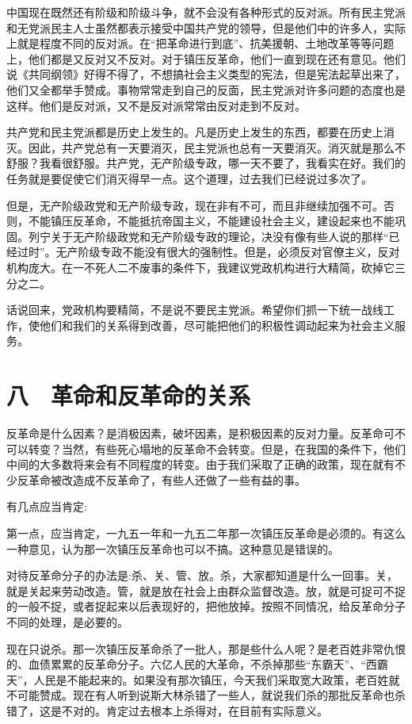 中国现在既然还有阶级和阶级斗争，就不会没有各种形式的反对派。所有民主党派和无党派民主人士虽然都表示接受中国共产党的领导，但是他们中的许多人，实际上就是程度不同的反对派。在“把革命进行到底”、抗美援朝、土地改革等等问题上，他们都是又反对又不反对。对于镇压反革命，他们一直到现在还有意见。他们说《共同纲领》好得不得了，不想搞社会主义类型的宪法，但是宪法起草出来了，他们又全都举手赞成。事物常常走到自己的反面，民主党派对许多问题的态度也是这样。他们是反对派，又不是反对派常常由反对走到不反对。

共产党和民主党派都是历史上发生的。凡是历史上发生的东西，都要在历史上消灭。因此，共产党总有一天要消灭，民主党派也总有一天要消灭。消灭就是那么不舒服？我看很舒服。共产党，无产阶级专政，哪一天不要了，我看实在好。我们的任务就是要促使它们消灭得早一点。这个道理，过去我们已经说过多次了。

但是，无产阶级政党和无产阶级专政，现在非有不可，而且非继续加强不可。否则，不能镇压反革命，不能抵抗帝国主义，不能建设社会主义，建设起来也不能巩固。列宁关于无产阶级政党和无产阶级专政的理论，决没有像有些人说的那样“已经过时”。无产阶级专政不能没有很大的强制性。但是，必须反对官僚主义，反对机构庞大。在一不死人二不废事的条件下，我建议党政机构进行大精简，砍掉它三分之二。

话说回来，党政机构要精简，不是说不要民主党派。希望你们抓一下统一战线工作，使他们和我们的关系得到改善，尽可能把他们的积极性调动起来为社会主义服务。

\section{八　革命和反革命的关系}

反革命是什么因素？是消极因素，破坏因素，是积极因素的反对力量。反革命可不可以转变？当然，有些死心塌地的反革命不会转变。但是，在我国的条件下，他们中间的大多数将来会有不同程度的转变。由于我们采取了正确的政策，现在就有不少反革命被改造成不反革命了，有些人还做了一些有益的事。

有几点应当肯定:

第一点，应当肯定，一九五一年和一九五二年那一次镇压反革命是必须的。有这么一种意见，认为那一次镇压反革命也可以不搞。这种意见是错误的。

对待反革命分子的办法是:杀、关、管、放。杀，大家都知道是什么一回事。关，就是关起来劳动改造。管，就是放在社会上由群众监督改造。放，就是可捉可不捉的一般不捉，或者捉起来以后表现好的，把他放掉。按照不同情况，给反革命分子不同的处理，是必要的。

现在只说杀。那一次镇压反革命杀了一批人，那是些什么人呢？是老百姓非常仇恨的、血债累累的反革命分子。六亿人民的大革命，不杀掉那些“东霸天”、“西霸天”，人民是不能起来的。如果没有那次镇压，今天我们采取宽大政策，老百姓就不可能赞成。现在有人听到说斯大林杀错了一些人，就说我们杀的那批反革命也杀错了，这是不对的。肯定过去根本上杀得对，在目前有实际意义。


